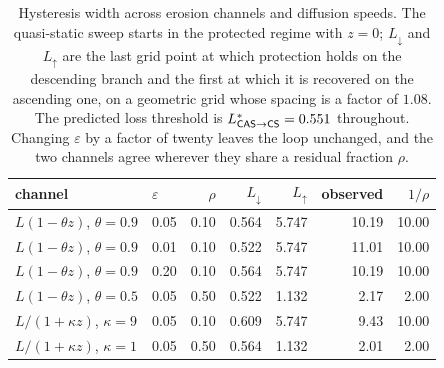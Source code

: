 \begin{table}[!ht]
\centering
\caption{Hysteresis width across erosion channels and diffusion speeds. The quasi-static sweep starts in the protected regime with $z=0$; $L_{\downarrow}$ and $L_{\uparrow}$ are the last grid point at which protection holds on the descending branch and the first at which it is recovered on the ascending one, on a geometric grid whose spacing is a factor of $1.08$. The predicted loss threshold is $L^{*}_{\textsf{CAS}\to\textsf{CS}}=0.551$ throughout. Changing $\varepsilon$ by a factor of twenty leaves the loop unchanged, and the two channels agree wherever they share a residual fraction $\rho$.}
\label{tab:hysteresis}
\begin{tabular}{llrrrrr}
\toprule
channel & $\varepsilon$ & $\rho$ & $L_{\downarrow}$ & $L_{\uparrow}$ & observed & $1/\rho$ \\
\midrule
$L(1-\theta z)$, $\theta=0.9$ & 0.05 & 0.10 & 0.564 & 5.747 & 10.19 & 10.00 \\
$L(1-\theta z)$, $\theta=0.9$ & 0.01 & 0.10 & 0.522 & 5.747 & 11.01 & 10.00 \\
$L(1-\theta z)$, $\theta=0.9$ & 0.20 & 0.10 & 0.564 & 5.747 & 10.19 & 10.00 \\
$L(1-\theta z)$, $\theta=0.5$ & 0.05 & 0.50 & 0.522 & 1.132 & 2.17 & 2.00 \\
$L/(1+\kappa z)$, $\kappa=9$ & 0.05 & 0.10 & 0.609 & 5.747 & 9.43 & 10.00 \\
$L/(1+\kappa z)$, $\kappa=1$ & 0.05 & 0.50 & 0.564 & 1.132 & 2.01 & 2.00 \\
\bottomrule
\end{tabular}
\end{table}
